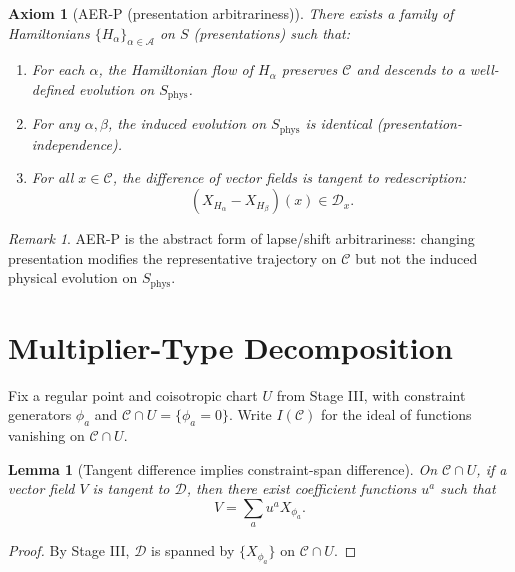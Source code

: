 \documentclass[11pt]{article}
\newtheorem{axiom}[definition]{Axiom}
\newtheorem{lemma}[definition]{Lemma}
\theoremstyle{remark}
\newtheorem{remark}[definition]{Remark}
\theoremstyle{plain}
\begin{document}
\begin{axiom}[AER-P (presentation arbitrariness)]
\label{ax:aerp}
There exists a family of Hamiltonians $\{H_{\alpha}\}_{\alpha\in\mathcal{A}}$ on $S$ (presentations) such that:
\begin{enumerate}
\item For each $\alpha$, the Hamiltonian flow of $H_{\alpha}$ preserves $\mathcal{C}$ and descends to a well-defined evolution on $S_{\mathrm{phys}}$.
\item For any $\alpha,\beta$, the induced evolution on $S_{\mathrm{phys}}$ is identical (presentation-independence).
\item For all $x\in\mathcal{C}$, the difference of vector fields is tangent to redescription:
\begin{equation}
(X_{H_{\alpha}}-X_{H_{\beta}})(x) \in \mathcal{D}_x.
\label{eq:diff-tangent}
\end{equation}
\end{enumerate}
\end{axiom}

\begin{remark}
AER-P is the abstract form of lapse/shift arbitrariness: changing presentation modifies the representative trajectory on $\mathcal{C}$ but not the induced physical evolution on $S_{\mathrm{phys}}$.
\end{remark}

\section{Multiplier-Type Decomposition}

Fix a regular point and coisotropic chart $U$ from Stage III, with constraint generators $\phi_a$ and $\mathcal{C}\cap U=\{\phi_a=0\}$.
Write $I(\mathcal{C})$ for the ideal of functions vanishing on $\mathcal{C}\cap U$.

\begin{lemma}[Tangent difference implies constraint-span difference]
\label{lem:tangent-span}
On $\mathcal{C}\cap U$, if a vector field $V$ is tangent to $\mathcal{D}$, then there exist coefficient functions $u^a$ such that
\begin{equation}
V = \sum_a u^a X_{\phi_a}.
\label{eq:Vspan}
\end{equation}
\end{lemma}

\begin{proof}
By Stage III, $\mathcal{D}$ is spanned by $\{X_{\phi_a}\}$ on $\mathcal{C}\cap U$.
\end{proof}
\end{document}
